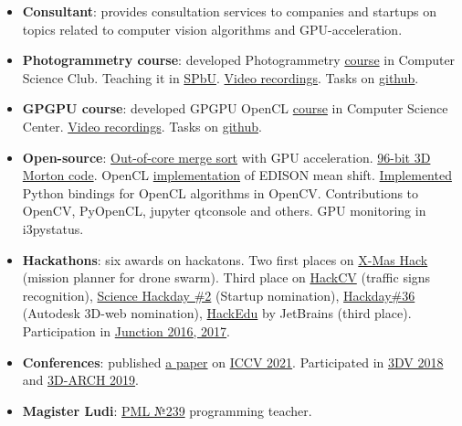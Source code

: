 \documentclass[11pt,oneside]{article}
\newcommand{\hhref}[2]{\href{#1}{\color{blue}#2}}
\begin{document}
\begin{itemize}
    \item{\textbf{Consultant}}: provides consultation services to companies and startups on topics related to computer vision algorithms and GPU-acceleration.

    \item{\textbf{Photogrammetry course}}: developed Photogrammetry  \hhref{https://compsciclub.ru/courses/photogrammetry/2021-spring/}{course} in Computer Science Club. Teaching it in \hhref{https://math-cs.spbu.ru/}{SPbU}.  \hhref{https://www.youtube.com/@polarnick239/playlists}{Video recordings}. Tasks on \hhref{https://github.com/PhotogrammetryCourse/}{github}.

    \item{\textbf{GPGPU course}}: developed GPGPU OpenCL \hhref{https://compscicenter.ru/courses/video_cards_computation/}{course} in Computer Science Center. \hhref{https://www.youtube.com/watch?v=L79PgDOcVfw&list=PLlb7e2G7aSpTgwAm0GBkvn5XA0NokovJJ}{Video recordings}. Tasks on \hhref{https://github.com/GPGPUCourse/}{github}.

    \item{\textbf{Open-source}: \hhref{https://github.com/PolarNick239/ExternalSortingOnGPU}{Out-of-core merge sort} with GPU acceleration. \hhref{https://gist.github.com/PolarNick239/7819fb7722fab09b37ecaee77c82cf58}{96-bit 3D Morton code}. OpenCL \hhref{https://github.com/PolarNick239/OpenMeanShift}{implementation} of EDISON mean shift. \hhref{https://github.com/opencv/opencv/pull/6078}{Implemented} Python bindings for OpenCL algorithms in OpenCV. Contributions to OpenCV, PyOpenCL, jupyter qtconsole and others. GPU monitoring in i3pystatus.}

    \item{\textbf{Hackathons}}: six awards on hackatons. Two first places on \hhref{https://github.com/PolarNick239/HackathonDroneSwarm}{X-Mas Hack} (mission planner for drone swarm). Third place on \hhref{https://career.luxoft.com/lp/hack-cv/}{HackCV} (traffic signs recognition), \hhref{http://hackday.ru/sciencehackday-2/projects\#project-1400}{Science Hackday \#2} (Startup nomination), \hhref{http://hackday.ru/hackday-36/projects\#project-1121}{Hackday\#36} (Autodesk 3D-web nomination), \hhref{https://www.hackerleague.org/hackathons/jetbrains-edtech-hackathon/blogposts/53655896e24d32cfbd000006}{HackEdu} by JetBrains (third place). Participation in \hhref{http://www.hackjunction.com/}{Junction 2016, 2017}.

    \item{\textbf{Conferences}}: published \hhref{https://www.polarnick.com/static/papers/poliarnyi2021.pdf}{a paper} on \hhref{http://iccv2021.thecvf.com/}{ICCV 2021}. Participated in \hhref{http://3dv18.uniud.it/}{3DV 2018} and \hhref{http://www.3d-arch.org/}{3D-ARCH 2019}.

    \item{\textbf{Magister Ludi}}: \hhref{http://239.ru}{PML №239} programming teacher.
\end{itemize}
\end{document}
